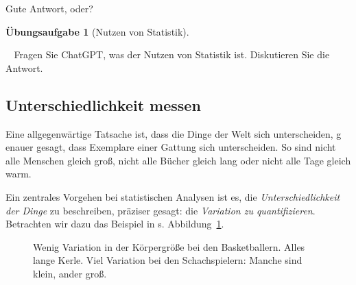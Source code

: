 \documentclass[
  a4paper,
  DIV=11]{scrreprt}
\theoremstyle{definition}
\newtheorem{exercise}{Übungsaufgabe}[chapter]
\theoremstyle{definition}
\theoremstyle{definition}
\theoremstyle{remark}
\begin{document}
Gute Antwort, oder?

\begin{exercise}[Nutzen von
Statistik]\protect\hypertarget{exr-nutzen-statistik}{}\label{exr-nutzen-statistik}

🏋️‍♀️ Fragen Sie ChatGPT, was der Nutzen von Statistik ist. Diskutieren Sie
die Antwort.

\end{exercise}

\subsection{Unterschiedlichkeit
messen}\label{unterschiedlichkeit-messen}

Eine allgegenwärtige Tatsache ist, dass die Dinge der Welt sich
unterscheiden, g enauer gesagt, dass Exemplare einer Gattung sich
unterscheiden. So sind nicht alle Menschen gleich groß, nicht alle
Bücher gleich lang oder nicht alle Tage gleich warm.

Ein zentrales Vorgehen bei statistischen Analysen ist es, die
\emph{Unterschiedlichkeit der Dinge} zu beschreiben, präziser gesagt:
die \emph{Variation zu quantifizieren}. Betrachten wir dazu das Beispiel
in s. Abbildung~\ref{fig-groesse}.

\begin{figure}


\caption{\label{fig-groesse}Wenig Variation in der Körpergröße bei den
Basketballern. Alles lange Kerle. Viel Variation bei den Schachspielern:
Manche sind klein, ander groß.}

\end{figure}%
\end{document}
